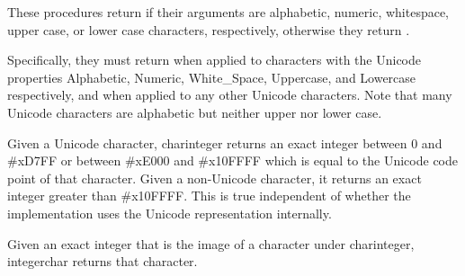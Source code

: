 \begin{entry}{%
}

These procedures return \schtrue{} if their arguments are alphabetic,
numeric, whitespace, upper case, or lower case characters, respectively,
otherwise they return \schfalse.  

Specifically, they must return \schtrue when applied to characters with
the Unicode properties Alphabetic, Numeric, White\_Space, Uppercase, and
Lowercase respectively, and \schfalse when applied to any other Unicode
characters.  Note that many Unicode characters are alphabetic but neither
upper nor lower case.

\end{entry}


%


\begin{entry}{%
}

Given a Unicode character, {\cf char\coerce{}integer} returns an
exact integer between 0 and \#xD7FF or between \#xE000 and \#x10FFFF
which is equal to the Unicode code point of that character.  Given a
non-Unicode character, it returns an exact integer greater than \#x10FFFF.
This is true independent of whether the implementation uses the Unicode
representation internally.

Given an exact integer that is the image of
a character under {\cf char\coerce{}integer}, {\cf integer\coerce{}char}
returns that character.
%
%
%
%
%
\end{entry}


